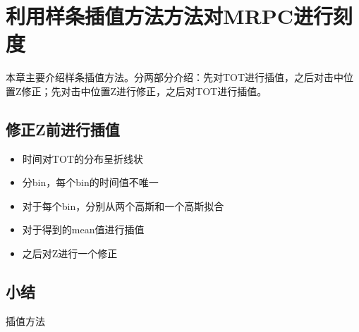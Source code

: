 \chapter{利用样条插值方法方法对MRPC进行刻度}
本章主要介绍样条插值方法。分两部分介绍：先对TOT进行插值，之后对击中位置Z修正；先对击中位置Z进行修正，之后对TOT进行插值。

\section{修正Z前进行插值}

\begin{itemize}
    \item 时间对TOT的分布呈折线状
    \item 分bin，每个bin的时间值不唯一
    \item 对于每个bin，分别从两个高斯和一个高斯拟合
    \item 对于得到的mean值进行插值
    \item 之后对Z进行一个修正
\end{itemize}

\section{小结}
插值方法
